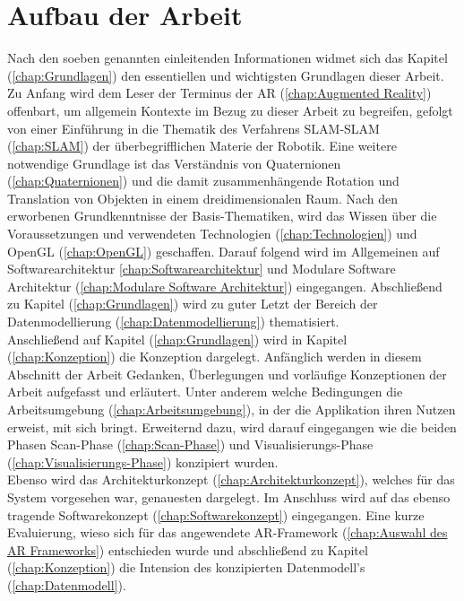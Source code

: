 \section{Aufbau der Arbeit}
\label{chap:Aufbau der Arbeit}
Nach den soeben genannten einleitenden Informationen widmet sich das Kapitel (\ref{chap:Grundlagen}) den essentiellen und wichtigsten 
Grundlagen dieser Arbeit. Zu Anfang wird dem Leser der Terminus der \acl{AR} (\ref{chap:Augmented Reality}) offenbart, um allgemein 
Kontexte im Bezug zu dieser Arbeit zu begreifen, gefolgt von einer Einführung in die Thematik des Verfahrens \ac{SLAM}-\acl{SLAM} 
(\ref{chap:SLAM}) der überbegrifflichen Materie der Robotik. Eine weitere notwendige Grundlage ist das Verständnis von Quaternionen 
(\ref{chap:Quaternionen}) und die damit zusammenhängende Rotation und Translation von Objekten in einem dreidimensionalen Raum. Nach 
den erworbenen Grundkenntnisse der Basis-Thematiken, wird das Wissen über die Voraussetzungen und verwendeten Technologien 
(\ref{chap:Technologien}) und OpenGL (\ref{chap:OpenGL}) geschaffen. Darauf folgend wird im Allgemeinen auf Softwarearchitektur 
\ref{chap:Softwarearchitektur} und Modulare Software Architektur (\ref{chap:Modulare Software Architektur}) eingegangen. Abschließend zu 
Kapitel (\ref{chap:Grundlagen}) wird zu guter Letzt der Bereich der Datenmodellierung (\ref{chap:Datenmodellierung}) thematisiert.
\\ 
\linebreak
Anschließend auf Kapitel (\ref{chap:Grundlagen}) wird in Kapitel (\ref{chap:Konzeption}) die Konzeption dargelegt. Anfänglich werden in 
diesem Abschnitt der Arbeit Gedanken, Überlegungen und vorläufige Konzeptionen der Arbeit aufgefasst und erläutert. Unter anderem 
welche Bedingungen die Arbeitsumgebung (\ref{chap:Arbeitsumgebung}), in der die Applikation ihren Nutzen erweist, mit sich bringt. 
Erweiternd dazu, wird darauf eingegangen wie die beiden Phasen Scan-Phase (\ref{chap:Scan-Phase}) und Visualisierungs-Phase 
(\ref{chap:Visualisierungs-Phase}) konzipiert wurden. 
\\ 
Ebenso wird das Architekturkonzept (\ref{chap:Architekturkonzept}), welches für das System vorgesehen war, genauesten dargelegt. 
Im Anschluss wird auf das ebenso tragende Softwarekonzept (\ref{chap:Softwarekonzept}) eingegangen. Eine kurze Evaluierung, wieso sich 
für das angewendete AR-Framework (\ref{chap:Auswahl des AR Frameworks}) entschieden wurde und abschließend zu Kapitel 
(\ref{chap:Konzeption}) die Intension des konzipierten Datenmodell's (\ref{chap:Datenmodell}). 
